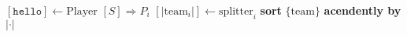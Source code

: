 \documentclass{article}
\begin{document}
\pagestyle{empty}

\newcommand{\send}{\Rightarrow}
\newcommand{\sendto}{\rightarrow}
\newcommand{\recv}{\Leftarrow}
\algrenewcommand{}
\algrenewcommand\textproc{\textrm}

\begin{algorithmic}

  \State $[\mathtt{hello}] \gets \mathrm{Player}$
  \State $[S] \send P_i$
  \EndIf
  \EndFor
  \EndWhile
  \EndProcedure
  \newline
  \State $[|\mathrm{team}_i|] \gets \mathrm{splitter}_i$
  \State \textbf{sort} $\{\mathrm{team}\}$ \textbf{acendently by} $|\cdot|$ 
  \EndWhile
  \EndProcedure

\end{algorithmic}
\end{document}
